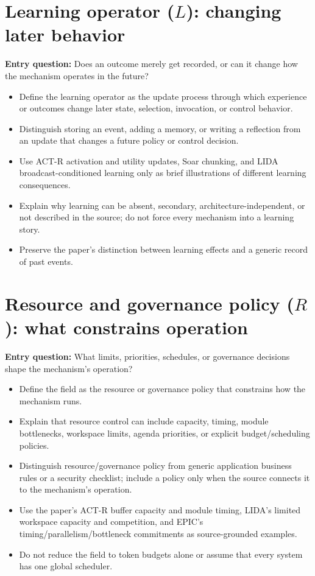 \section{Learning operator ($L$): changing later behavior}
\textbf{Entry question:} Does an outcome merely get recorded, or can it change how the mechanism operates in the future?
\begin{itemize}
  \item Define the learning operator as the update process through which experience or outcomes change later state, selection, invocation, or control behavior.
  \item Distinguish storing an event, adding a memory, or writing a reflection from an update that changes a future policy or control decision.
  \item Use ACT-R activation and utility updates, Soar chunking, and LIDA broadcast-conditioned learning only as brief illustrations of different learning consequences.
  \item Explain why learning can be absent, secondary, architecture-independent, or not described in the source; do not force every mechanism into a learning story.
  \item Preserve the paper's distinction between learning effects and a generic record of past events.
\end{itemize}

\section{Resource and governance policy ($R$): what constrains operation}
\textbf{Entry question:} What limits, priorities, schedules, or governance decisions shape the mechanism's operation?
\begin{itemize}
  \item Define the field as the resource or governance policy that constrains how the mechanism runs.
  \item Explain that resource control can include capacity, timing, module bottlenecks, workspace limits, agenda priorities, or explicit budget/scheduling policies.
  \item Distinguish resource/governance policy from generic application business rules or a security checklist; include a policy only when the source connects it to the mechanism's operation.
  \item Use the paper's ACT-R buffer capacity and module timing, LIDA's limited workspace capacity and competition, and EPIC's timing/parallelism/bottleneck commitments as source-grounded examples.
  \item Do not reduce the field to token budgets alone or assume that every system has one global scheduler.
\end{itemize}

